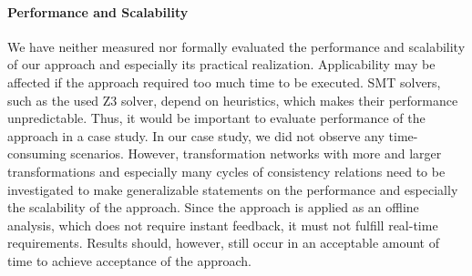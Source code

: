 
\paragraph{Performance and Scalability}
We have neither measured nor formally evaluated the performance and scalability of our approach and especially its practical realization.
Applicability may be affected if the approach required too much time to be executed.
\gls{SMT} solvers, such as the used Z3 solver, depend on heuristics, which makes their performance unpredictable.
Thus, it would be important to evaluate performance of the approach in a case study.
In our case study, %
we did not observe any time-consuming scenarios.
However, transformation networks with more and larger transformations and especially many cycles of consistency relations need to be investigated to make generalizable statements on the performance and especially the scalability of the approach.
Since the approach is applied as an offline analysis, which does not require instant feedback, it must not fulfill real-time requirements.
Results should, however, still occur in an acceptable amount of time to achieve acceptance of the approach.







